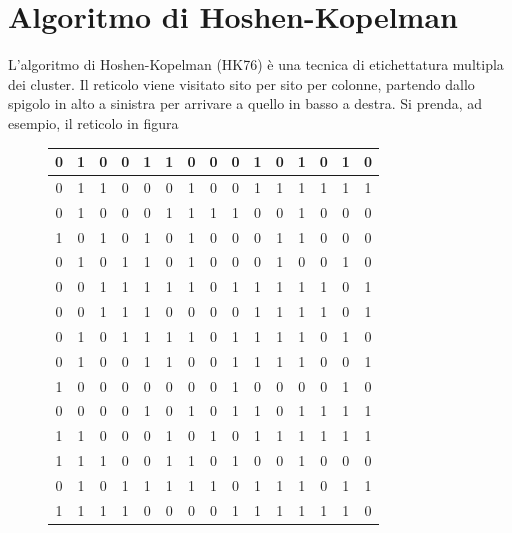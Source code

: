 \section{Algoritmo di Hoshen-Kopelman}
L’algoritmo di Hoshen-Kopelman (HK76) è una tecnica di etichettatura multipla dei cluster. Il reticolo viene visitato sito per sito per colonne, partendo dallo spigolo in alto a sinistra per arrivare a quello in basso a destra. Si prenda, ad esempio, il reticolo
in figura
\begin{figure}[H]
	\centering
	\scriptsize %
	\setlength{\tabcolsep}{5.4pt} %
	\renewcommand{\arraystretch}{1.3} %
	\begin{minipage}{0.45\textwidth}
		\centering
		\begin{tabular}{|*{15}{c|}}
			\hline
			0 & 1 & 0 & 0 & 1 & 1 & 0 & 0 & 0 & 1 & 0 & 1 & 0 & 1 & 0 \\
			\hline
			0 & 1 & 1 & 0 & 0 & 0 & 1 & 0 & 0 & 1 & 1 & 1 & 1 & 1 & 1 \\
			\hline
			0 & 1 & 0 & 0 & 0 & 1 & 1 & 1 & 1 & 0 & 0 & 1 & 0 & 0 & 0 \\
			\hline
			1 & 0 & 1 & 0 & 1 & 0 & 1 & 0 & 0 & 0 & 1 & 1 & 0 & 0 & 0 \\
			\hline
			0 & 1 & 0 & 1 & 1 & 0 & 1 & 0 & 0 & 0 & 1 & 0 & 0 & 1 & 0 \\
			\hline
			0 & 0 & 1 & 1 & 1 & 1 & 1 & 0 & 1 & 1 & 1 & 1 & 1 & 0 & 1 \\
			\hline
			0 & 0 & 1 & 1 & 1 & 0 & 0 & 0 & 0 & 1 & 1 & 1 & 1 & 0 & 1 \\
			\hline
			0 & 1 & 0 & 1 & 1 & 1 & 1 & 0 & 1 & 1 & 1 & 1 & 0 & 1 & 0 \\
			\hline
			0 & 1 & 0 & 0 & 1 & 1 & 0 & 0 & 1 & 1 & 1 & 1 & 0 & 0 & 1 \\
			\hline
			1 & 0 & 0 & 0 & 0 & 0 & 0 & 0 & 1 & 0 & 0 & 0 & 0 & 1 & 0 \\
			\hline
			0 & 0 & 0 & 0 & 1 & 0 & 1 & 0 & 1 & 1 & 0 & 1 & 1 & 1 & 1 \\
			\hline
			1 & 1 & 0 & 0 & 0 & 1 & 0 & 1 & 0 & 1 & 1 & 1 & 1 & 1 & 1 \\
			\hline
			1 & 1 & 1 & 0 & 0 & 1 & 1 & 0 & 1 & 0 & 0 & 1 & 0 & 0 & 0 \\
			\hline
			0 & 1 & 0 & 1 & 1 & 1 & 1 & 1 & 0 & 1 & 1 & 1 & 0 & 1 & 1 \\
			\hline
			1 & 1 & 1 & 1 & 0 & 0 & 0 & 0 & 1 & 1 & 1 & 1 & 1 & 1 & 0 \\
			\hline

\end{tabular}
\end{minipage}
\end{figure}
